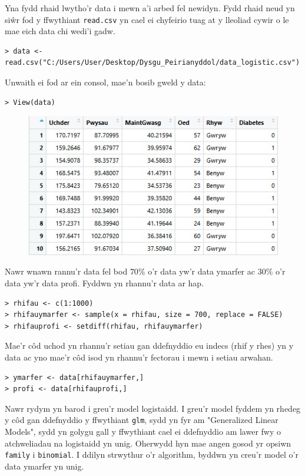 Yna fydd rhaid lwytho'r data i mewn a'i arbed fel newidyn. Fydd rhaid neud yn si\^{w}r fod y ffwythiant \texttt{read.csv} yn cael ei chyfeirio tuag at y lleoliad cywir o le mae eich data chi wedi'i gadw.

\begin{verbatim}
> data <- read.csv("C:/Users/User/Desktop/Dysgu_Peirianyddol/data_logistic.csv")
\end{verbatim}

Unwaith ei fod ar ein consol, mae'n bosib gweld y data:

\begin{verbatim}
> View(data)
\end{verbatim}

\begin{figure}[H]
\begin{center}
\includegraphics[width=0.5\linewidth]{../img/data_diabetes_r.jpg}
\end{center}
\end{figure}

Nawr wnawn rannu'r data fel bod $70\%$ o'r data yw'r data ymarfer ac $30\%$ o'r data yw'r data profi. Fyddwn yn rhannu'r data ar hap. 

\begin{verbatim}
> rhifau <- c(1:1000)
> rhifauymarfer <- sample(x = rhifau, size = 700, replace = FALSE)
> rhifauprofi <- setdiff(rhifau, rhifauymarfer)
\end{verbatim}

Mae'r c\^{o}d uchod yn rhannu'r setiau gan ddefnyddio eu indecs (rhif y rhes) yn y data ac yno mae'r c\^{o}d isod yn rhannu'r fectorau i mewn i setiau arwahan. 

\begin{verbatim}
> ymarfer <- data[rhifauymarfer,] 
> profi <- data[rhifauprofi,]
\end{verbatim}

Nawr rydym yn barod i greu'r model logistaidd. I greu'r model fyddem yn rhedeg y c\^{o}d gan ddefnyddio y ffwythiant \texttt{glm}, sydd yn fyr am "Generalized Linear Models", sydd yn golygu gall y ffwythiant cael ei ddefnyddio am lawer fwy o atchweliadau na logistaidd yn unig. Oherwydd hyn mae angen gosod yr opsiwn \texttt{family} i \texttt{binomial}. I ddilyn strwythur o'r algorithm, byddwn yn creu'r model o'r data ymarfer yn unig. 

